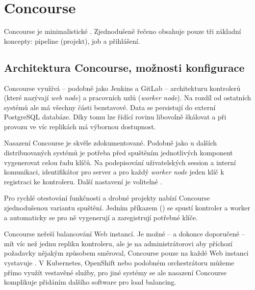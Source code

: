 \section{Concourse}
    Concourse je minimalistické \CI. Zjednodušeně řečeno obsahuje pouze tři základní koncepty: pipeline (projekt), job a přihlášení.



    \subsection{Architektura Concourse, možnosti konfigurace}
        Concourse využívá -- podobně jako Jenkins a GitLab -- architekturu kontrolerů (které nazývají \textit{web node}) a pracovních uzlů (\textit{worker node}). Na rozdíl od ostatních systémů ale má všechny části bezstavové. Data se persistují do externí PostgreSQL databáze. Díky tomu lze řídící rovinu libovolně škálovat a při provozu ve víc replikách má výbornou dostupnost.


        Nasazení Concourse je skvěle zdokumentované. Podobně jako u dalších distribuovaných systémů je potřeba před spuštěním jednotlivých komponent vygenerovat celou řadu klíčů. Na podepisování uživatelských session a interní komunikaci, identifikátor pro  server a pro každý \textit{worker node} jeden klíč k registraci ke kontroleru. Další nastavení je volitelné .

        Pro rychlé otestování funkčnosti a drobné projekty nabízí Concourse zjednodušenou variantu spuštění. Jedním příkazem () se spustí kontroler a worker a automaticky se pro ně vygenerují a zaregistrují potřebné klíče.

        Concourse neřeší balancování Web instancí. Je možné -- a dokonce doporučené -- mít víc než jednu repliku kontroleru, ale je na administrátorovi aby příchozí požadavky nějakým způsobem směroval, Concourse pouze na každé Web instanci vystavuje  . V Kubernetes, OpenShift nebo podobném orchestrátoru můžeme přímo využít vestavěné služby, pro jiné systémy se ale nasazení Concourse komplikuje přidáním dalšího software pro load balancing.

